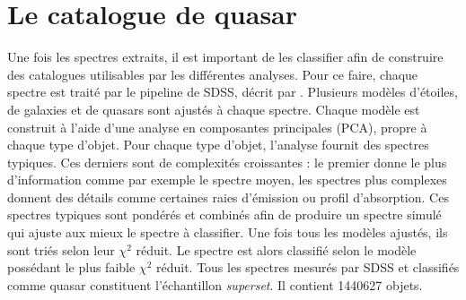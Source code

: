 \section{Le catalogue de quasar}
Une fois les spectres extraits, il est important de les classifier afin de construire des catalogues utilisables par les différentes analyses. Pour ce faire, chaque spectre est traité par le pipeline de SDSS, décrit par \textcite{Bolton2012}.
Plusieurs modèles d'étoiles, de galaxies et de quasars sont ajustés à chaque spectre.
Chaque modèle est construit à l'aide d'une analyse en composantes principales (PCA), propre à chaque type d'objet. Pour chaque type d'objet, l'analyse fournit des spectres typiques. Ces derniers sont de complexités croissantes : le premier donne le plus d'information comme par exemple le spectre moyen, les spectres plus complexes donnent des détails comme certaines raies d'émission ou profil d'absorption. Ces spectres typiques sont pondérés et combinés afin de produire un spectre simulé qui ajuste aux mieux le spectre à classifier.
Une fois tous les modèles ajustés, ils sont triés selon leur $\chi^{2}$ réduit. Le spectre est alors classifié selon le modèle possédant le plus faible $\chi^{2}$ réduit.
Tous les spectres mesurés par SDSS et classifiés comme quasar constituent l'échantillon \emph{superset}. Il contient \num{1440627} objets.

